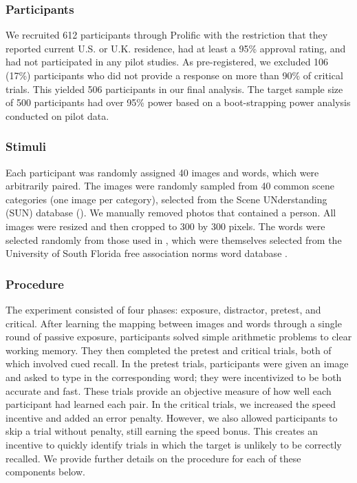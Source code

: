 \subsubsection{Participants}

We recruited 612 participants through Prolific with the restriction that they reported current U.S. or U.K. residence, had at least a 95\% approval rating, and had not participated in any pilot studies. As pre-registered, we excluded 106 (17\%) participants who did not provide a response on more than 90\% of critical trials. This yielded 506 participants in our final analysis. The target sample size of 500 participants had over 95\% power based on a boot-strapping power analysis conducted on pilot data.

\subsubsection{Stimuli}

Each participant was randomly assigned 40 images and words, which were arbitrarily paired. The images were randomly sampled from 40 common scene categories (one image per category), selected from the Scene UNderstanding (SUN) database (\citealt{5539970}). We manually removed photos that contained a person. All images were resized and then cropped to 300 by 300 pixels. The words were selected randomly from those used in \citet{madan2021exploring}, which were themselves selected from the University of South Florida free association norms word database \citep{nelson2004university}.

\subsubsection{Procedure}

The experiment consisted of four phases: exposure, distractor, pretest, and critical. After learning the mapping between images and words through a single round of passive exposure, participants solved simple arithmetic problems to clear working memory. They then completed the pretest and critical trials, both of which involved cued recall. In the pretest trials, participants were given an image and asked to type in the corresponding word; they were incentivized to be both accurate and fast. These trials provide an objective measure of how well each participant had learned each pair. In the critical trials, we increased the speed incentive and added an error penalty. However, we also allowed participants to skip a trial without penalty, still earning the speed bonus. This creates an incentive to quickly identify trials in which the target is unlikely to be correctly recalled. We provide further details on the procedure for each of these components below.

